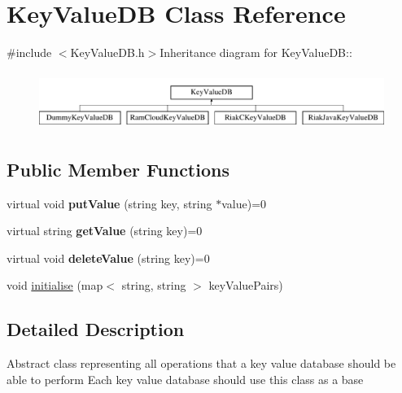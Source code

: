 \hypertarget{classKeyValueDB}{
\section{KeyValueDB Class Reference}
\label{classKeyValueDB}
}


{\ttfamily \#include $<$KeyValueDB.h$>$}Inheritance diagram for KeyValueDB::\begin{figure}[H]
\begin{center}
\leavevmode
\includegraphics[height=1.87919cm]{classKeyValueDB}
\end{center}
\end{figure}
\subsection*{Public Member Functions}
\begin{DoxyCompactItemize}
\item 
\hypertarget{classKeyValueDB_a2b847092e0f3cac06b4e326661e9cd71}{
virtual void {\bfseries putValue} (string key, string $\ast$value)=0}
\label{classKeyValueDB_a2b847092e0f3cac06b4e326661e9cd71}

\item 
\hypertarget{classKeyValueDB_a651f01bff7dc8be6c68be6b3ec2ea519}{
virtual string {\bfseries getValue} (string key)=0}
\label{classKeyValueDB_a651f01bff7dc8be6c68be6b3ec2ea519}

\item 
\hypertarget{classKeyValueDB_a8431ec48c41b6c0cbfd2c2b8e8d13f4d}{
virtual void {\bfseries deleteValue} (string key)=0}
\label{classKeyValueDB_a8431ec48c41b6c0cbfd2c2b8e8d13f4d}

\item 
void \hyperlink{classKeyValueDB_aebd32f35aa2c11ac0d071bd8307fc521}{initialise} (map$<$ string, string $>$ keyValuePairs)
\end{DoxyCompactItemize}


\subsection{Detailed Description}
Abstract class representing all operations that a key value database should be able to perform Each key value database should use this class as a base 

